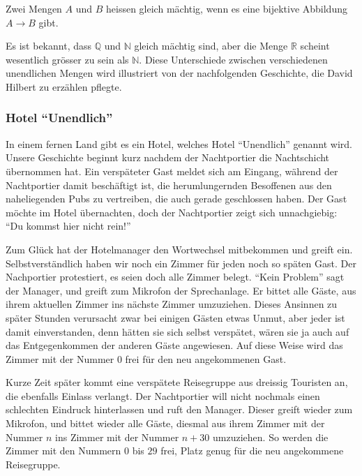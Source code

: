 \begin{definition}
%
Zwei Mengen $A$ und $B$ heissen gleich mächtig, wenn es eine bijektive
Abbildung $A\to B$ gibt.
\end{definition}

Es ist bekannt, dass $\mathbb Q$ und $\mathbb N$ gleich mächtig sind,
aber die Menge $\mathbb R$ scheint wesentlich grösser
zu sein als $\mathbb N$.
Diese Unterschiede zwischen verschiedenen
unendlichen Mengen wird illustriert von der nachfolgenden Geschichte,
die David Hilbert zu erzählen pflegte.

\subsubsection{Hotel ``Unendlich''}
%
%
In einem fernen Land gibt es ein Hotel, welches Hotel ``Unendlich''
genannt wird. Unsere Geschichte beginnt kurz nachdem der Nachtportier
die Nachtschicht übernommen hat. Ein verspäteter Gast meldet sich
am Eingang, während der Nachtportier damit beschäftigt ist,
die herumlungernden Besoffenen
aus den naheliegenden Pubs zu vertreiben, die auch gerade geschlossen haben.
Der Gast möchte im Hotel übernachten, doch der Nachtportier zeigt sich
unnachgiebig: ``Du kommst hier nicht rein!''

Zum Glück hat der Hotelmanager den Wortwechsel mitbekommen und greift
ein. Selbstverständlich haben wir noch ein Zimmer für jeden noch so
späten Gast. Der Nachportier protestiert, es seien doch alle Zimmer
belegt. ``Kein Problem'' sagt der Manager, und greift zum Mikrofon
der Sprechanlage. Er bittet alle Gäste, aus ihrem aktuellen Zimmer
ins nächste Zimmer umzuziehen. Dieses Ansinnen zu später Stunden
verursacht zwar bei einigen Gästen etwas Unmut, aber jeder ist damit
einverstanden, denn hätten sie sich selbst verspätet, wären sie ja
auch auf das Entgegenkommen der anderen Gäste angewiesen. Auf diese
Weise wird das Zimmer mit der Nummer $0$ frei für den neu angekommenen
Gast.

Kurze Zeit später kommt eine verspätete Reisegruppe aus dreissig
Touristen an, die ebenfalls
Einlass verlangt. Der Nachtportier will nicht nochmals einen schlechten
Eindruck hinterlassen und ruft den Manager. Dieser greift
wieder zum Mikrofon, und bittet wieder alle Gäste, diesmal aus
ihrem Zimmer mit der Nummer $n$ ins Zimmer mit der Nummer $n+30$
umzuziehen. So werden die Zimmer mit den Nummern $0$ bis $29$ frei,
Platz genug für die neu angekommene Reisegruppe.

